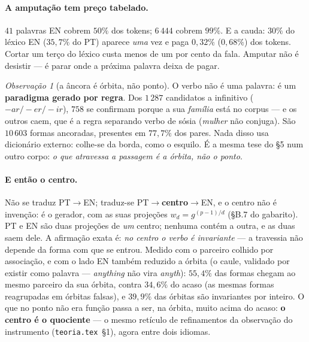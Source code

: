 \documentclass[11pt,a4paper]{article}
\theoremstyle{remark}
\newtheorem{obs}{Observação}
\begin{document}
\paragraph{A amputação tem preço tabelado.} $41$ palavras EN cobrem $50\%$ dos tokens; $6\,444$ cobrem
$99\%$. E a cauda: $30\%$ do léxico EN ($35{,}7\%$ do PT) aparece \emph{uma} vez e paga $0{,}32\%$
($0{,}68\%$) dos tokens. Cortar um terço do léxico custa menos de um por cento da fala. Amputar não é
desistir --- é parar onde a próxima palavra deixa de pagar.

\begin{obs}[a âncora é órbita, não ponto]\label{obs:orbita}
O verbo não é uma palavra: é um \textbf{paradigma gerado por regra}. Dos $1\,287$ candidatos a
infinitivo ($-ar/-er/-ir$), $758$ se confirmam porque a sua \emph{família} está no corpus --- e os
outros caem, que é a regra separando verbo de sósia (\emph{mulher} não conjuga). São $10\,603$ formas
ancoradas, presentes em $77{,}7\%$ dos pares. Nada disso usa dicionário externo: colhe-se da borda, como
o esquilo. É a mesma tese do §5 num outro corpo: \emph{o que atravessa a passagem é a órbita, não o
ponto}.
\end{obs}

\paragraph{E então o centro.} Não se traduz PT$\to$EN; traduz-se PT$\to$\textbf{centro}$\to$EN, e o
centro não é invenção: é o gerador, com as suas projeções $w_d=g^{(p-1)/d}$ (§B.7 do gabarito). PT e EN
são duas projeções de \emph{um} centro; nenhuma contém a outra, e as duas saem dele. A afirmação exata
é: \emph{no centro o verbo é invariante} --- a travessia não depende da forma com que se entrou. Medido
com o parceiro colhido por associação, e com o lado EN também reduzido a órbita (o caule, validado por
existir como palavra --- \emph{anything} não vira \emph{anyth}): $55{,}4\%$ das formas chegam ao mesmo
parceiro da sua órbita, contra $34{,}6\%$ do acaso (as mesmas formas reagrupadas em órbitas falsas), e
$39{,}9\%$ das órbitas são invariantes por inteiro. O que no ponto não era função passa a ser, na
órbita, muito acima do acaso: \textbf{o centro é o quociente} --- o mesmo retículo de refinamentos da
observação do instrumento (\texttt{teoria.tex}~§1), agora entre dois idiomas.
\end{document}
